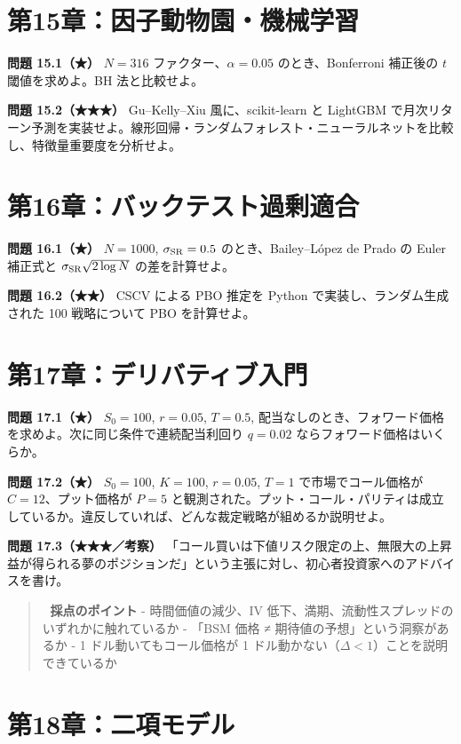 \documentclass[11pt,a4paper]{report}
\begin{document}
\section{第15章：因子動物園・機械学習}

\textbf{問題 15.1（★）} $N = 316$ ファクター、$\alpha = 0.05$ のとき、Bonferroni 補正後の $t$ 閾値を求めよ。BH 法と比較せよ。

\textbf{問題 15.2（★★★）} Gu–Kelly–Xiu 風に、scikit-learn と LightGBM で月次リターン予測を実装せよ。線形回帰・ランダムフォレスト・ニューラルネットを比較し、特徴量重要度を分析せよ。

\section{第16章：バックテスト過剰適合}

\textbf{問題 16.1（★）} $N = 1000$, $\sigma_{\rm SR} = 0.5$ のとき、Bailey–López de Prado の Euler 補正式と $\sigma_{\rm SR}\sqrt{2 \log N}$ の差を計算せよ。

\textbf{問題 16.2（★★）} CSCV による PBO 推定を Python で実装し、ランダム生成された 100 戦略について PBO を計算せよ。

\section{第17章：デリバティブ入門}

\textbf{問題 17.1（★）} $S_0 = 100$, $r = 0.05$, $T = 0.5$, 配当なしのとき、フォワード価格を求めよ。次に同じ条件で連続配当利回り $q = 0.02$ ならフォワード価格はいくらか。

\textbf{問題 17.2（★）} $S_0 = 100$, $K = 100$, $r = 0.05$, $T = 1$ で市場でコール価格が $C = 12$、プット価格が $P = 5$ と観測された。プット・コール・パリティは成立しているか。違反していれば、どんな裁定戦略が組めるか説明せよ。

\textbf{問題 17.3（★★★／考察）} 「コール買いは下値リスク限定の上、無限大の上昇益が得られる夢のポジションだ」という主張に対し、初心者投資家へのアドバイスを書け。

\begin{quote}
📝 \textbf{採点のポイント}
- 時間価値の減少、IV 低下、満期、流動性スプレッドのいずれかに触れているか
- 「BSM 価格 ≠ 期待値の予想」という洞察があるか
- 1 ドル動いてもコール価格が 1 ドル動かない（$\Delta < 1$）ことを説明できているか
\end{quote}

\section{第18章：二項モデル}
\end{document}
